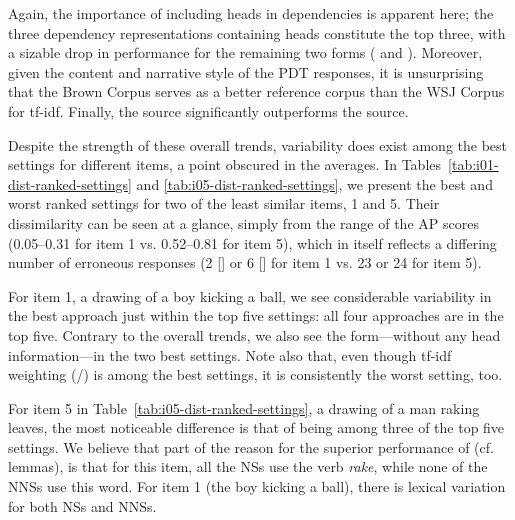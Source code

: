 Again, the importance of including heads in dependencies is apparent here; the three dependency representations containing heads constitute the top three, with a sizable drop in performance for the remaining two forms ( and ). Moreover, given the content and narrative style of the PDT responses, it is unsurprising that the Brown Corpus serves as a better reference corpus than the WSJ Corpus for tf-idf. Finally, the  source significantly outperforms the  source.

Despite the strength of these overall trends, variability
does exist among the best settings for different items, a point obscured
in the averages.  In Tables~\ref{tab:i01-dist-ranked-settings} and
\ref{tab:i05-dist-ranked-settings}, we present the best and worst
ranked settings for two of the least similar items, 1 and 5.
Their dissimilarity can be seen at a glance, simply from the range of
the AP scores (0.05--0.31 for item 1 vs. 0.52--0.81 for item 5), which
in itself reflects a differing number of erroneous responses (2 []
or 6 [] for item 1 vs. 23 or 24 for item 5).

For item 1, a drawing of a boy kicking a ball, we see considerable
variability in the best approach just within the top five settings:
all four approaches are in the top five.  Contrary to the overall
trends, we also see the  form---without any head
information---in the two best settings.  Note also that, even though
tf-idf weighting (/) is among the best settings, it is
consistently the worst setting, too.

For item 5 in Table~\ref{tab:i05-dist-ranked-settings}, a drawing of a
man raking leaves, the most noticeable difference is that
of  being among three of the top five settings.
We believe that part of the reason for
the superior performance of  (cf. lemmas), is that for this
item, all the NSs use the verb \textit{rake}, while none of the NNSs use this word.  For item 1 (the boy kicking a ball), there is lexical variation
for both NSs and NNSs.

